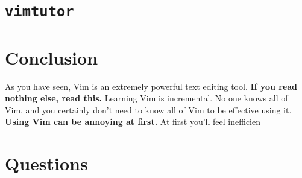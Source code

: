 \section{\texttt{vimtutor}}

\section{Conclusion}
As you have seen, Vim is an extremely powerful text editing tool. {\bf If
you read nothing else, read this.} Learning Vim is incremental. No one 
knows all of Vim, and you certainly don't need to know all of Vim to
be effective using it. {\bf Using Vim can be annoying at first.} At first
you'll feel inefficien

\section{Questions}


